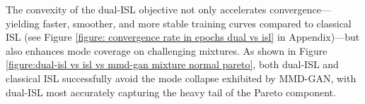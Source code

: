 \documentclass{article}
\newcommand{\normdist}[2]{\mathcal{N}(#1, #2)}
\begin{document}

The convexity of the dual-ISL objective not only accelerates convergence—yielding faster, smoother, and more stable training curves compared to classical ISL (see Figure \ref{figure: convergence rate in epochs dual vs isl} in Appendix)—but also enhances mode coverage on challenging mixtures.  As shown in Figure \ref{figure:dual-isl vs isl vs mmd-gan mixture normal pareto}, both dual-ISL and classical ISL successfully avoid the mode collapse exhibited by MMD-GAN, with dual-ISL most accurately capturing the heavy tail of the Pareto component.  
\end{document}
